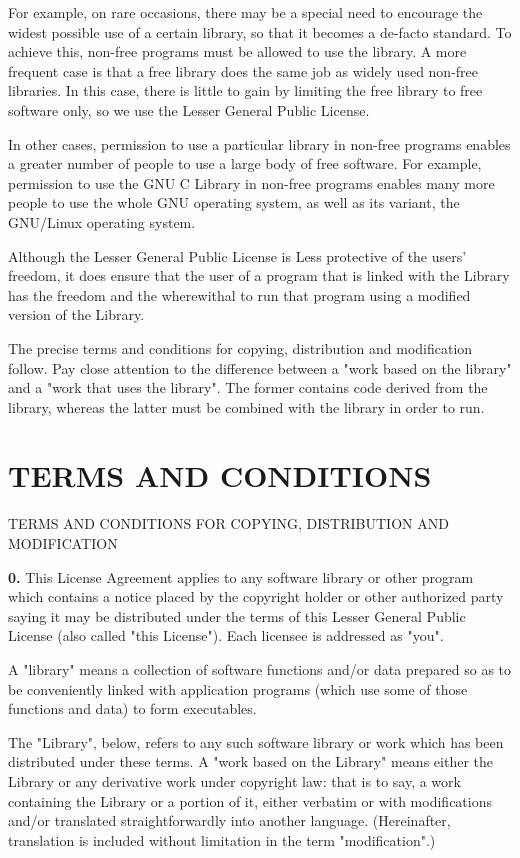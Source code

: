 For example, on rare occasions, there may be a special need to encourage the
widest possible use of a certain library, so that it becomes a de-facto
standard. To achieve this, non-free programs must be allowed to use the
library. A more frequent case is that a free library does the same job as
widely used non-free libraries. In this case, there is little to gain by
limiting the free library to free software only, so we use the Lesser General
Public License. 

In other cases, permission to use a particular library in non-free programs
enables a greater number of people to use a large body of free software. For
example, permission to use the GNU C Library in non-free programs enables many
more people to use the whole GNU operating system, as well as its variant, the
GNU/Linux operating system. 

Although the Lesser General Public License is Less protective of the users'
freedom, it does ensure that the user of a program that is linked with the
Library has the freedom and the wherewithal to run that program using a
modified version of the Library. 

The precise terms and conditions for copying, distribution and modification
follow. Pay close attention to the difference between a "work based on the
library" and a "work that uses the library". The former contains code
derived from the library, whereas the latter must be combined with the library
in order to run. 

\section{TERMS AND CONDITIONS}
\label{SEC34}

TERMS AND CONDITIONS FOR COPYING, DISTRIBUTION AND MODIFICATION 

{\bf 0.} This License Agreement applies to any software library or other
program which contains a notice placed by the copyright holder or other
authorized party saying it may be distributed under the terms of this Lesser
General Public License (also called "this License"). Each licensee is
addressed as "you". 

A "library" means a collection of software functions and/or data prepared so
as to be conveniently linked with application programs (which use some of
those functions and data) to form executables. 

The "Library", below, refers to any such software library or work which has
been distributed under these terms. A "work based on the Library" means
either the Library or any derivative work under copyright law: that is to say,
a work containing the Library or a portion of it, either verbatim or with
modifications and/or translated straightforwardly into another language.
(Hereinafter, translation is included without limitation in the term
"modification".) 

